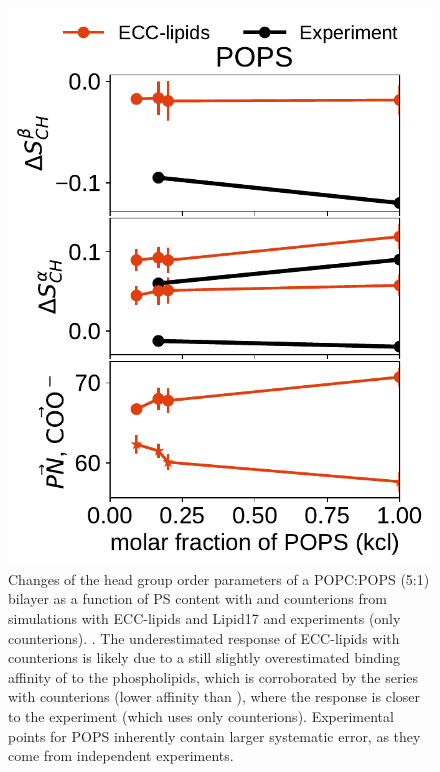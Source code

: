 \documentclass[journal=jpcbfk,manuscript=article]{achemso}
\newlength{\figwidth}
\newlength{\figwidthsmall}
\begin{document}
\begin{figure}[htb!]
  \includegraphics[width=\figwidthsmall]{../Fig/order_parameters_changes_A-B_PC-PS_mix_POPS_kcl.pdf} 
  \caption{\label{fig:delta_ordPar_NaCl_PC-PS_mix} 
    Changes of the head group order parameters of a POPC:POPS (5:1) bilayer as a function of PS content
    with  and  counterions from simulations with ECC-lipids and Lipid17 \cite{lipid17-future} 
    and experiments (only  counterions). \cite{roux90}. 
    The underestimated response of ECC-lipids with  counterions 
    is likely due to a still slightly overestimated binding affinity of  to the phospholipids,
    which is corroborated by the series with  counterions (lower affinity than ),
    where the response is closer to the experiment (which uses only  counterions). 
    Experimental points for POPS inherently contain larger systematic error, 
    as they come from independent experiments.
  } 
\end{figure} 
\end{document}
